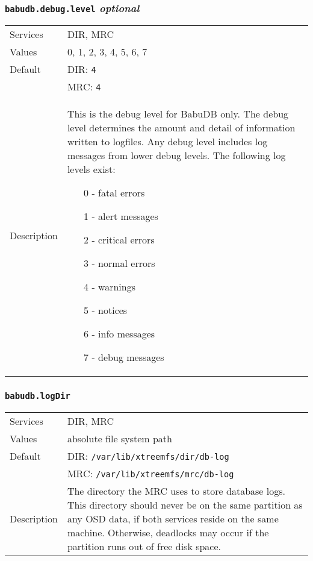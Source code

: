 \documentclass[a4paper,10pt]{book}
\begin{document}
\subsubsection{\texttt{babudb.debug.level} \textit{optional}}
\begin{tabular}{lp{10cm}}
 Services & DIR, MRC\\
 Values   & 0, 1, 2, 3, 4, 5, 6, 7 \\
 Default  & DIR: \texttt{4}\\
		  & MRC: \texttt{4}\\
 Description & This is the debug level for BabuDB only. The debug level determines the amount and detail of information written to logfiles. Any debug level includes log messages from lower debug levels. The following log levels exist:
\begin{enumerate}
 \item[0 -] fatal errors
 \item[1 -] alert messages
 \item[2 -] critical errors
 \item[3 -] normal errors
 \item[4 -] warnings
 \item[5 -] notices
 \item[6 -] info messages
 \item[7 -] debug messages
\end{enumerate}
\end{tabular}

\subsubsection{\texttt{babudb.logDir}}
\begin{tabular}{lp{10cm}}
 Services & DIR, MRC\\
 Values   & absolute file system path\\
 Default  & DIR: \texttt{/var/lib/xtreemfs/dir/db-log}\\
          & MRC: \texttt{/var/lib/xtreemfs/mrc/db-log}\\
 Description & The directory the MRC uses to store database logs. This directory should never be on the same partition as any OSD data, if both services reside on the same machine. Otherwise, deadlocks may occur if the partition runs out of free disk space.
\end{tabular}
\end{document}
